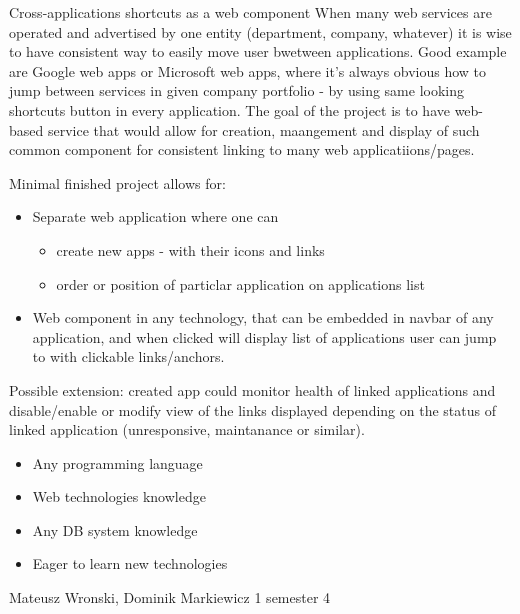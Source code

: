 \begin{project}
{Cross-applications shortcuts as a web component}
{When many web services are operated and advertised by one entity (department, company, whatever) it is wise to have consistent way to easily move user bwetween applications. Good example are Google web apps or Microsoft web apps, where it's always obvious how to jump between services in given company portfolio - by using same looking shortcuts button in every application. The goal of the project is to have web-based service that would allow for creation, maangement and display of such common component for consistent linking to many web applicatiions/pages.} 
{
Minimal finished project allows for:
\begin{itemize}
	\item Separate web application where one can 
		\begin{itemize}
			\item create new apps - with their icons and links
			\item order or position of particlar application on applications list
		\end{itemize}
	\item Web component in any technology, that can be embedded in navbar of any application, and when clicked will display list of applications user can jump to with clickable links/anchors.
\end{itemize}
\bigbreak
Possible extension: created app could monitor health of linked applications and disable/enable or modify view of the links displayed depending on the status of linked application (unresponsive, maintanance or similar).
}
{
\begin{itemize}
	\item Any programming language
	\item Web technologies knowledge
	\item Any DB system knowledge
	\item Eager to learn new technologies
\end{itemize}
}
{Mateusz Wronski, Dominik Markiewicz}
{1 semester}
{4}
\end{project}